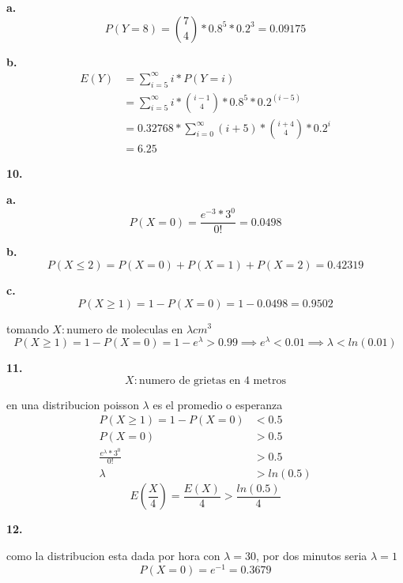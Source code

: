 \documentclass[12pt,fleqn]{article}
\begin{document}
\textbf{a.}
\[P(Y=8)=\binom{7}{4}*0.8^5*0.2^3=0.09175\]

\textbf{b.}
\begin{align*}
  E(Y)&=\sum_{i=5}^{\infty} i*P(Y=i)\\
      &=\sum_{i=5}^{\infty} i*\binom{i-1}{4}*0.8^5*0.2^{(i-5)}\\
      &=0.32768*\sum_{i=0}^{\infty} (i+5)*\binom{i+4}{4}*0.2^i\\
      &=6.25
\end{align*}

\textbf{10.}

\textbf{a.}
\[P(X=0)=\frac{e^{-3}*3^0}{0!}=0.0498\]

\textbf{b.}
\[P(X \le 2)=P(X=0)+P(X=1)+P(X=2)=0.42319\]

\textbf{c.}
\[P(X \ge 1)=1-P(X=0)=1-0.0498=0.9502\]

tomando $X: \textrm{numero de moleculas en }\lambda cm^3$
\[P(X \ge 1)=1-P(X=0)=1-e^{\lambda}>0.99 \implies e^{\lambda}<0.01 \implies \lambda<ln(0.01)\]


\textbf{11.}
\[X: \textrm{numero de grietas en 4 metros}\]

en una distribucion poisson $\lambda$ es el promedio o esperanza
\begin{align*}
  P(X \ge 1)=1-P(X=0)&<0.5\\
  P(X=0)&>0.5\\
  \frac{e^{\lambda}*3^0}{0!}&>0.5\\
  \lambda&>ln(0.5)
\end{align*}
\[E(\frac{X}{4})=\frac{E(X)}{4}>\frac{ln(0.5)}{4}\]

\textbf{12.}

como la distribucion esta dada por hora con $\lambda=30$, por dos minutos seria $\lambda=1$
\[P(X=0)=e^{-1}=0.3679\]
\end{document}
